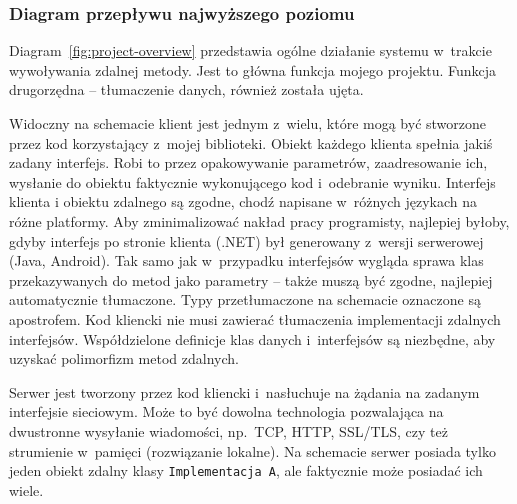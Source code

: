 \subsubsection{Diagram przepływu najwyższego poziomu}
Diagram~\ref{fig:project-overview} przedstawia ogólne działanie systemu w~trakcie wywoływania zdalnej metody. Jest to główna funkcja mojego projektu. Funkcja drugorzędna -- tłumaczenie danych, również została ujęta.

Widoczny na schemacie klient jest jednym z~wielu, które mogą być stworzone przez kod korzystający z~mojej biblioteki.
Obiekt każdego klienta spełnia jakiś zadany interfejs. Robi to przez opakowywanie parametrów, zaadresowanie ich, wysłanie do obiektu faktycznie wykonującego kod i~odebranie wyniku.
Interfejs klienta i obiektu zdalnego są zgodne, chodź napisane w~różnych językach na różne platformy. Aby zminimalizować nakład pracy programisty, najlepiej byłoby, gdyby interfejs po stronie klienta (.NET) był generowany z~wersji serwerowej (Java, Android).
Tak samo jak w~przypadku interfejsów wygląda sprawa klas przekazywanych do metod jako parametry -- także muszą być zgodne, najlepiej automatycznie tłumaczone.
Typy przetłumaczone na schemacie oznaczone są apostrofem.
Kod kliencki nie musi zawierać tłumaczenia implementacji zdalnych interfejsów.
Współdzielone definicje klas danych i~interfejsów są niezbędne, aby uzyskać polimorfizm metod zdalnych.

Serwer jest tworzony przez kod kliencki i~nasłuchuje na żądania na zadanym interfejsie sieciowym. Może to być dowolna technologia pozwalająca na dwustronne wysyłanie wiadomości, np.\ TCP, HTTP, SSL/TLS, czy też strumienie w~pamięci (rozwiązanie lokalne).
Na schemacie serwer posiada tylko jeden obiekt zdalny klasy \texttt{Implementacja A}, ale faktycznie może posiadać ich wiele.

